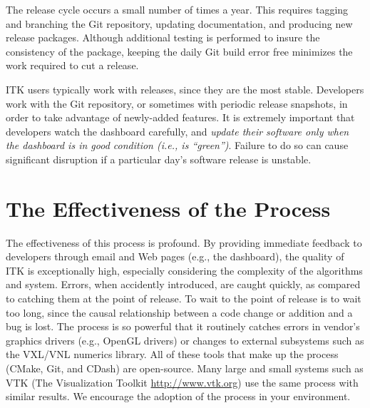 The release cycle occurs a small number of times a year. This requires
tagging and branching the Git repository, updating documentation, and
producing new release packages. Although additional testing is performed to
insure the consistency of the package, keeping the daily Git build error free
minimizes the work required to cut a release.

ITK users typically work with releases, since they are the most
stable. Developers work with the Git repository, or sometimes with periodic
release snapshots, in order to take advantage of newly-added features. It is
extremely important that developers watch the dashboard carefully, and
\emph{update their software only when the dashboard is in good condition
(i.e., is ``green'')}. Failure to do so can cause significant disruption if a
particular day's software release is unstable.

\section{The Effectiveness of the Process}
\label{sec:Effectiveness}

The effectiveness of this process is profound. By providing immediate
feedback to developers through email and Web pages (e.g., the dashboard), the
quality of ITK is exceptionally high, especially considering the complexity
of the algorithms and system. Errors, when accidently introduced, are caught
quickly, as compared to catching them at the point of release. To wait to the
point of release is to wait too long, since the causal relationship between a
code change or addition and a bug is lost. The process is so powerful that it
routinely catches errors in vendor's graphics drivers (e.g., OpenGL drivers)
or changes to external subsystems such as the VXL/VNL numerics library. All
of these tools that make up the process (CMake, Git, and CDash) are
open-source. Many large and small systems such as VTK (The Visualization
Toolkit \url{http://www.vtk.org}) use the same process with similar
results. We encourage the adoption of the process in your environment.
